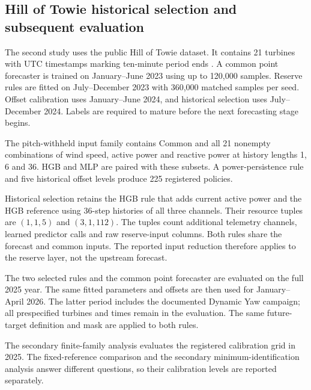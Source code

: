 \subsection{Hill of Towie historical selection and subsequent evaluation}
The second study uses the public Hill of Towie dataset. It contains 21 turbines with UTC timestamps marking ten-minute period ends \cite{clerc2026towie}. A common point forecaster is trained on January--June 2023 using up to 120,000 samples. Reserve rules are fitted on July--December 2023 with 360,000 matched samples per seed. Offset calibration uses January--June 2024, and historical selection uses July--December 2024. Labels are required to mature before the next forecasting stage begins.

The pitch-withheld input family contains Common and all 21 nonempty combinations of wind speed, active power and reactive power at history lengths 1, 6 and 36. HGB and MLP are paired with these subsets. A power-persistence rule and five historical offset levels produce 225 registered policies.

Historical selection retains the HGB rule that adds current active power and the HGB reference using 36-step histories of all three channels. Their resource tuples are $(1,1,5)$ and $(3,1,112)$. The tuples count additional telemetry channels, learned predictor calls and raw reserve-input columns. Both rules share the forecast and common inputs. The reported input reduction therefore applies to the reserve layer, not the upstream forecast.

The two selected rules and the common point forecaster are evaluated on the full 2025 year. The same fitted parameters and offsets are then used for January--April 2026. The latter period includes the documented Dynamic Yaw campaign; all prespecified turbines and times remain in the evaluation. The same future-target definition and mask are applied to both rules.

The secondary finite-family analysis evaluates the registered calibration grid in 2025. The fixed-reference comparison and the secondary minimum-identification analysis answer different questions, so their calibration levels are reported separately.
